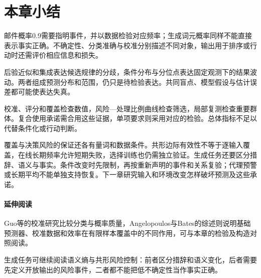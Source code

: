 \section{本章小结}
\label{sec:reliability-summary}

邮件概率0.9需要指明事件，并以数据检验对应频率；生成词元概率同样不能直接表示事实正确。不确定性、分类准确与校准分别描述不同对象，输出用于排序或行动时还需评价相应信息和损失。

后验近似和集成表达候选规律的分歧，条件分布与分位点表达固定观测下的结果波动。两者组成预测分布和范围，仍只是待检验表达。共同盲点、模型假设与估计误差都可能使表达失真。

校准、评分和覆盖检查数值，风险—处理比例曲线检查筛选，局部复测检查重要群体。复合使用承诺需合用这些证据，单项要求则采用对应的检验。总体指标不足以代替条件化或行动判断。

覆盖与决策风险的保证还各有量词和数据条件。共形边际有效性不等于逐输入覆盖，在线长期频率允许短期失败，选择训练也仍需独立验证。生成任务还要区分措辞、语义与事实。条件改变时先限制，再按重新声明的事件和关系复验；代理预警或长期平均不能单独支持恢复。下一章研究输入和环境改变怎样破坏预测及这些承诺。

\paragraph{延伸阅读}

Guo等的校准研究比较分类与概率质量，Angelopoulos与Bates的综述则说明基础预测器、校准数据和效率在有限样本覆盖中的不同作用，可与本章的检验及构造对照阅读。

生成任务可继续阅读语义熵与共形风险控制：前者区分措辞和语义变化，后者需要先定义开放输出的风险事件，二者都不能把低不确定性当作事实正确。
